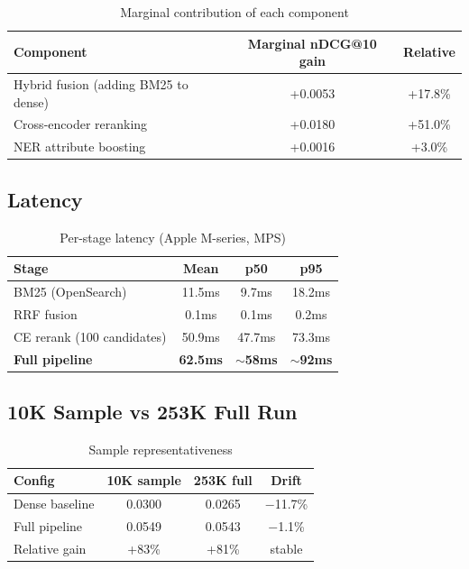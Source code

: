 \documentclass[11pt,a4paper]{article}
\begin{document}
\begin{table}[h]
\centering
\caption{Marginal contribution of each component}
\begin{tabular}{lcc}
\toprule
\textbf{Component} & \textbf{Marginal nDCG@10 gain} & \textbf{Relative} \\
\midrule
Hybrid fusion (adding BM25 to dense) & +0.0053 & +17.8\% \\
Cross-encoder reranking & +0.0180 & +51.0\% \\
NER attribute boosting & +0.0016 & +3.0\% \\
\bottomrule
\end{tabular}
\end{table}

\subsection{Latency}

\begin{table}[h]
\centering
\caption{Per-stage latency (Apple M-series, MPS)}
\begin{tabular}{lccc}
\toprule
\textbf{Stage} & \textbf{Mean} & \textbf{p50} & \textbf{p95} \\
\midrule
BM25 (OpenSearch) & 11.5ms & 9.7ms & 18.2ms \\
RRF fusion & 0.1ms & 0.1ms & 0.2ms \\
CE rerank (100 candidates) & 50.9ms & 47.7ms & 73.3ms \\
\textbf{Full pipeline} & \textbf{62.5ms} & \textbf{$\sim$58ms} & \textbf{$\sim$92ms} \\
\bottomrule
\end{tabular}
\end{table}

\subsection{10K Sample vs 253K Full Run}

\begin{table}[h]
\centering
\caption{Sample representativeness}
\begin{tabular}{lccc}
\toprule
\textbf{Config} & \textbf{10K sample} & \textbf{253K full} & \textbf{Drift} \\
\midrule
Dense baseline & 0.0300 & 0.0265 & $-$11.7\% \\
Full pipeline & 0.0549 & 0.0543 & $-$1.1\% \\
Relative gain & +83\% & +81\% & stable \\
\bottomrule
\end{tabular}
\end{table}
\end{document}
